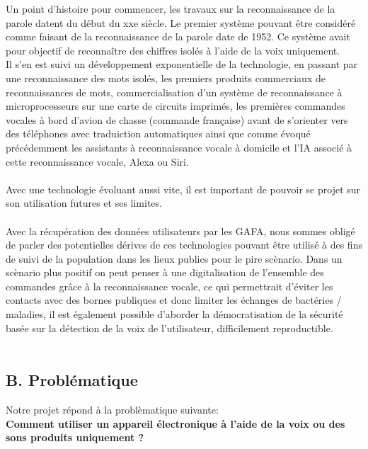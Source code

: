 \documentclass[a4paper,11pt]{book}
\begin{document}
\noindent Un point d'histoire pour commencer, les travaux sur la reconnaissance de la parole datent du début du xxe siècle. Le premier système pouvant être considéré comme faisant de la reconnaissance de la parole date de 1952. Ce système avait pour objectif de reconnaître des chiffres isolés à l'aide de la voix uniquement. \\ 
Il s'en est suivi un développement exponentielle de la technologie, en passant par une reconnaissance des mots isolés, les premiers produits commerciaux de reconnaissances de mots, commercialisation d'un système de reconnaissance à microprocesseurs sur une carte de circuits imprimés, les premières commandes vocales à bord d'avion de chasse (commande française) avant de s'orienter vers des téléphones avec traduiction automatiques ainsi que comme évoqué précédemment les assistants à reconnaissance vocale à domicile et l'IA associé à cette reconnaissance vocale, Alexa ou Siri. \\ \\
Avec une technologie évoluant aussi vite, il est important de pouvoir se projet sur son utilisation futures et ses limites. \\ \\
Avec la récupération des données utilisateurs par les GAFA, nous sommes obligé de parler des potentielles dérives de ces technologies pouvant être utilisé à des fins de suivi de la population dans les lieux publics pour le pire scènario. Dans un scènario plus positif on peut penser à une digitalisation de l'ensemble des commandes grâce à la reconnaissance vocale, ce qui permettrait d'éviter les contacts avec des bornes publiques et donc limiter les échanges de bactéries / maladies, il est également possible d'aborder la démocratisation de la sécurité basée sur la détection de la voix de l'utilisateur, difficilement reproductible. \\ \\

\subsection*{B. Problématique}
Notre projet répond à la problèmatique suivante: \\ \textbf{Comment utiliser un appareil électronique à l'aide de la voix ou des sons produits uniquement ?} \\ \\
\end{document}
